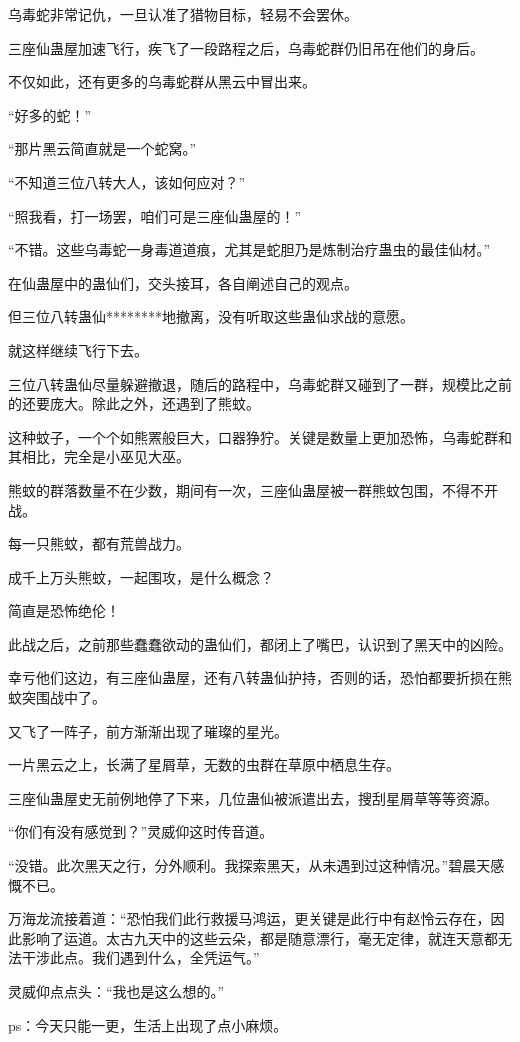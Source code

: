 \begin{this_body}
乌毒蛇非常记仇，一旦认准了猎物目标，轻易不会罢休。

三座仙蛊屋加速飞行，疾飞了一段路程之后，乌毒蛇群仍旧吊在他们的身后。

不仅如此，还有更多的乌毒蛇群从黑云中冒出来。

“好多的蛇！”

“那片黑云简直就是一个蛇窝。”

“不知道三位八转大人，该如何应对？”

“照我看，打一场罢，咱们可是三座仙蛊屋的！”

“不错。这些乌毒蛇一身毒道道痕，尤其是蛇胆乃是炼制治疗蛊虫的最佳仙材。”

在仙蛊屋中的蛊仙们，交头接耳，各自阐述自己的观点。

但三位八转蛊仙********地撤离，没有听取这些蛊仙求战的意愿。

就这样继续飞行下去。

三位八转蛊仙尽量躲避撤退，随后的路程中，乌毒蛇群又碰到了一群，规模比之前的还要庞大。除此之外，还遇到了熊蚊。

这种蚊子，一个个如熊罴般巨大，口器狰狞。关键是数量上更加恐怖，乌毒蛇群和其相比，完全是小巫见大巫。

熊蚊的群落数量不在少数，期间有一次，三座仙蛊屋被一群熊蚊包围，不得不开战。

每一只熊蚊，都有荒兽战力。

成千上万头熊蚊，一起围攻，是什么概念？

简直是恐怖绝伦！

此战之后，之前那些蠢蠢欲动的蛊仙们，都闭上了嘴巴，认识到了黑天中的凶险。

幸亏他们这边，有三座仙蛊屋，还有八转蛊仙护持，否则的话，恐怕都要折损在熊蚊突围战中了。

又飞了一阵子，前方渐渐出现了璀璨的星光。

一片黑云之上，长满了星屑草，无数的虫群在草原中栖息生存。

三座仙蛊屋史无前例地停了下来，几位蛊仙被派遣出去，搜刮星屑草等等资源。

“你们有没有感觉到？”灵威仰这时传音道。

“没错。此次黑天之行，分外顺利。我探索黑天，从未遇到过这种情况。”碧晨天感慨不已。

万海龙流接着道：“恐怕我们此行救援马鸿运，更关键是此行中有赵怜云存在，因此影响了运道。太古九天中的这些云朵，都是随意漂行，毫无定律，就连天意都无法干涉此点。我们遇到什么，全凭运气。”

灵威仰点点头：“我也是这么想的。”

ps：今天只能一更，生活上出现了点小麻烦。

\end{this_body}


